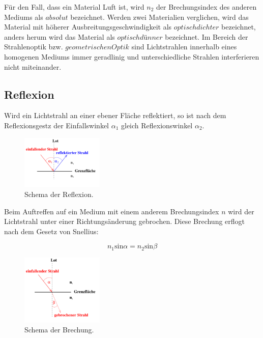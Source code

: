     \noindent Für den Fall, dass ein Material Luft ist, wird $n_2$ der Brechungsindex des anderen Mediums als $absolut$ bezeichnet. Werden zwei 
    Materialien verglichen, wird das Material mit höherer Ausbreitungsgeschwindigkeit als $optisch dichter$ bezeichnet, anders herum wird das 
    Material als $optisch dünner$ bezeichnet. Im Bereich der Strahlenoptik bzw. $geometrischen Optik$ sind Lichtstrahlen innerhalb eines 
    homogenen Mediums immer geradlinig und unterschiedliche Strahlen interferieren nicht miteinander.

    \subsection{Reflexion}

        \noindent Wird ein Lichtstrahl an einer ebener Fläche reflektiert, so ist nach dem Reflexionsgestz der Einfallswinkel $\alpha_1$ gleich 
        Reflexionswinkel $\alpha_2$.

        \begin{figure}[H]
            \centering
            \includegraphics[width=0.35\textwidth]{latex/images/T2.PNG}
            \caption{Schema der Reflexion\protect \cite{400}.}
        \end{figure}


        \noindent Beim Auftreffen auf ein Medium mit einem anderem Brechungsindex $n$ wird der Lichtstrahl unter einer Richtungsänderung 
        gebrochen. Diese Brechung erflogt nach dem Gesetz von Snellius:

        \begin{equation}
            n_1 \text{sin} \alpha = n_2 \text{sin} \beta
        \end{equation}

        \begin{figure}[H]
            \centering
            \includegraphics[width=0.35\textwidth]{latex/images/T3.PNG}
            \caption{Schema der Brechung\protect \cite{400}.}
        \end{figure}

